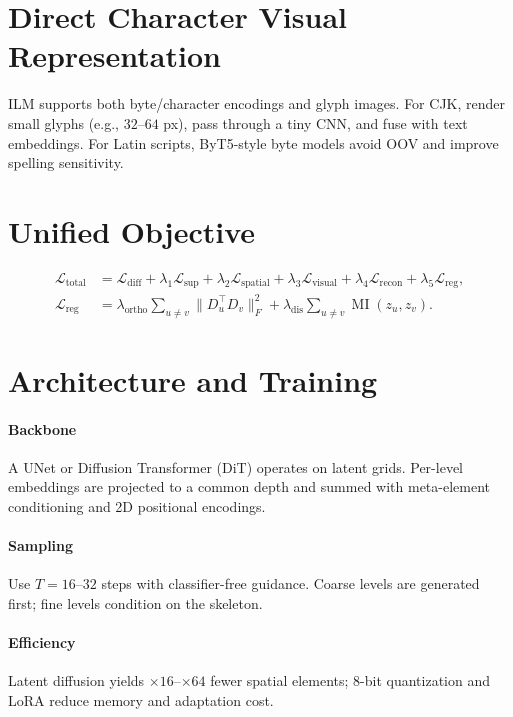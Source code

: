 \documentclass[11pt]{article}
\begin{document}
\section{Direct Character Visual Representation}
ILM supports both byte/character encodings and glyph images. For CJK, render small glyphs (e.g., $32$--$64$ px), pass through a tiny CNN, and fuse with text embeddings. For Latin scripts, ByT5-style byte models avoid OOV and improve spelling sensitivity.

\section{Unified Objective}
\begin{align}
\mathcal{L}_{\text{total}}
&= \mathcal{L}_{\text{diff}}
 + \lambda_1 \mathcal{L}_{\text{sup}}
 + \lambda_2 \mathcal{L}_{\text{spatial}}
 + \lambda_3 \mathcal{L}_{\text{visual}}
 + \lambda_4 \mathcal{L}_{\text{recon}}
 + \lambda_5 \mathcal{L}_{\text{reg}}, \\[-2pt]
\mathcal{L}_{\text{reg}} &= \lambda_{\text{ortho}} \sum_{u\neq v}\|D_u^\top D_v\|_F^2 + \lambda_{\text{dis}}\sum_{u\neq v} \operatorname{MI}(z_u,z_v).
\end{align}

\section{Architecture and Training}
\paragraph{Backbone} A UNet or Diffusion Transformer (DiT) operates on latent grids. Per-level embeddings are projected to a common depth and summed with meta-element conditioning and 2D positional encodings.

\paragraph{Sampling} Use $T{=}16$--$32$ steps with classifier-free guidance. Coarse levels are generated first; fine levels condition on the skeleton.

\paragraph{Efficiency} Latent diffusion yields $\times 16$--$\times 64$ fewer spatial elements; 8-bit quantization and LoRA reduce memory and adaptation cost.
\end{document}
